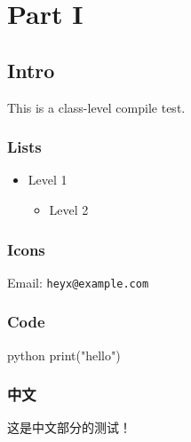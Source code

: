 \documentclass[outputdir=build,chapterstyle=cn,shorthand=false,indent=true,boxes=true,refs=true,algorithm=true,code=true]{Hypo-Note}
\begin{document}
\makecover
\tableofcontents

\chapter{Part I}

\section{Intro}
This is a class-level compile test.

\subsection{Lists}
\begin{itemize}
  \item Level 1
  \begin{itemize}
    \item Level 2
  \end{itemize}
\end{itemize}

\subsection{Icons}
Email:  \texttt{heyx@example.com}

\subsection{Code}
\begin{hypocode}[linenos=true]{python}
print("hello")
\end{hypocode}
\subsection{中文}
这是中文部分的测试！
\end{document}
